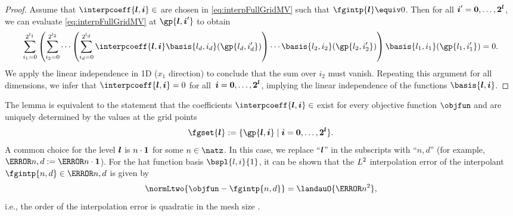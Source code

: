 \begin{proof}
  Assume that $\interpcoeff{\*l,\*i} \in \real$ are chosen in \eqref{eq:interpFullGridMV}
  such that $\fgintp{\*l} \equiv 0$.
  Then for all ${\boldsymbol{i}}' = {\boldsymbol{0}}, \dotsc, {\boldsymbol{2}}^{{\boldsymbol{l}}}$,
  we can evaluate \eqref{eq:interpFullGridMV} at $\gp{\*l,\*i'}$ to obtain
  \begin{equation}
    \sum_{i_1=0}^{2^{l_1}}
    \left(\sum_{i_2=0}^{2^{l_2}} \dotsb
    \left(\sum_{i_d=0}^{2^{l_d}} \interpcoeff{\*l,\*i} \basis{l_d,i_d}(\gp{l_d,i_d'})\right) \dotsb
    \basis{l_2,i_2}(\gp{l_2,i_2'})\right) \basis{l_1,i_1}(\gp{l_1,i_1'})
    = 0.
  \end{equation}
  We apply the linear independence in 1D ($x_1$ direction) to conclude that
  the sum over $i_2$ must vanish.
  Repeating this argument for all dimensions, we infer that $\interpcoeff{\*l,\*i} = 0$
  for all~${\boldsymbol{i}} = {\boldsymbol{0}}, \dotsc, {\boldsymbol{2}}^{{\boldsymbol{l}}}$,
  implying the linear independence of the functions $\basis{\*l,\*i}$.
\end{proof}
The lemma is equivalent to the statement that the coefficients $\interpcoeff{\*l,\*i} \in \real$
exist for every objective function $\objfun$ and are uniquely determined by
the values at the grid points
\begin{equation}
  \fgset{\*l}
  := \{\gp{\*l,\*i} \mid \*i = \*0, \dotsc, \*2^{\*l}\}.
\end{equation}
A common choice for the level ${\boldsymbol{l}}$ is $n \cdot {\boldsymbol{1}}$ for some $n \in \natz$.
In this case, we replace ``${\boldsymbol{l}}$'' in the subscripts with ``$n{,}d$''
(for example, $\ns{n,d} := \ns{n \cdot \*1}$).
For the hat function basis $\bspl{l,i}{1}$,
it can be shown that the $L^2$ interpolation error of the interpolant
$\fgintp{n,d} \in \ns{n,d}$ is given by
\begin{equation}
  \normLtwo{\objfun - \fgintp{n,d}} = \landauO{\ms{n}^2},
\end{equation}
i.e., the order of the interpolation error is quadratic in the mesh size
.
